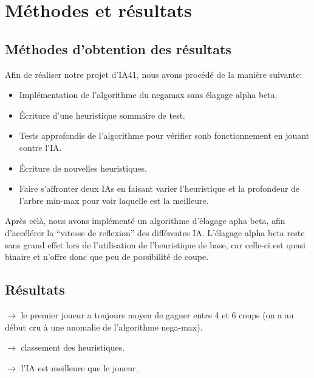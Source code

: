 \chapter{Méthodes et résultats}\label{chapter:methodes-resultats}

\section{Méthodes d'obtention des résultats}

    Afin de réaliser notre projet d'IA41, nous avons procédé de la manière suivante:
    
    \begin{itemize}
        \item Implémentation de l'algorithme du negamax sans élagage alpha beta.
        \item Écriture d'une heuristique sommaire de test.
        \item Tests approfondis de l'algorithme pour vérifier sonb fonctionnement en jouant contre l'IA\@.
        \item Écriture de nouvelles heuristiques.
        \item Faire s'affronter deux IAs en faisant varier l'heuristique et la profondeur de l'arbre min-max pour voir laquelle est
            la meilleure.
    \end{itemize}

    Après celà, nous avons implémenté un algorithme d'élagage apha beta, afin d'accélérer la ``vitesse de reflexion'' des différentes
    IA\@. L'élagage alpha beta reste sans grand effet lors de l'utilisation de l'heuristique de base, car celle-ci est quasi binaire
    et n'offre donc que peu de possibilité de coupe.

\section{Résultats}

    \(\rightarrow\) le premier joueur a toujours moyen de gagner entre 4 et 6 coups
    (on a au début cru à une anomalie de l'algorithme nega-max).

    \(\rightarrow\) classement des heuristiques.

    \(\rightarrow\) l'IA est meilleure que le joueur.

